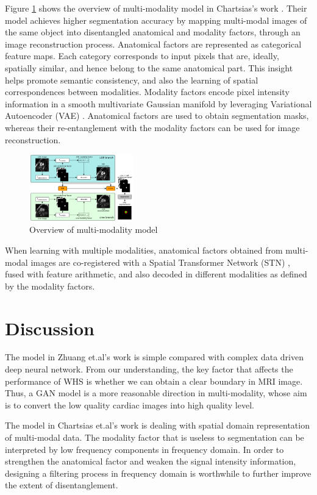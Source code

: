 \documentclass[10pt,sigconf,letterpaper,nonacm]{acmart}
\begin{document}
 Figure \ref{kaihuang_overview} shows the overview of multi-modality model in Chartsias's work \cite{chartsias2019multi}. Their model achieves higher segmentation accuracy by mapping multi-modal images of the same object into disentangled anatomical and modality factors, through an image reconstruction process. Anatomical factors are represented as categorical feature maps. Each category corresponds to input pixels that are, ideally, spatially similar, and hence belong to the same anatomical part. This insight helps promote semantic consistency, and also the learning of spatial correspondences between modalities. Modality factors encode pixel intensity information in a smooth multivariate Gaussian manifold by leveraging Variational Autoencoder (VAE) \cite{KingmaW13}. Anatomical factors are used to obtain segmentation masks, whereas their re-entanglement with the modality factors can be used for image reconstruction.
 
\begin{figure}
	\centering
	\includegraphics[width=0.4\textwidth]{images/kaihuang_overview.png}
	\caption{Overview of multi-modality model}
	\label{kaihuang_overview}
\end{figure} 
 When learning with multiple modalities, anatomical factors obtained from multi-modal images are co-registered with a Spatial Transformer Network (STN) \cite{JaderbergSZK15}, fused with feature arithmetic, and also decoded in different modalities as defined by the modality factors.
 
 
 \section{Discussion}
 The model in Zhuang et.al's work\cite{zhuang2016multi} is simple compared with complex data driven deep neural network. From our understanding, the key factor that affects the performance of WHS is whether we can obtain a clear boundary in MRI image. Thus, a GAN model is a more reasonable direction in multi-modality, whose aim is to convert the low quality cardiac images into high quality level.
 
 The model in Chartsias et.al's work \cite{chartsias2019multi} is dealing with spatial domain representation of multi-modal data. The modality factor that is useless to segmentation can be interpreted by low frequency components in frequency domain. In order to strengthen the anatomical factor and weaken the signal intensity information, designing a filtering process in frequency domain is worthwhile to further improve the extent of disentanglement.



\setcounter{page}{1}


\end{document}
